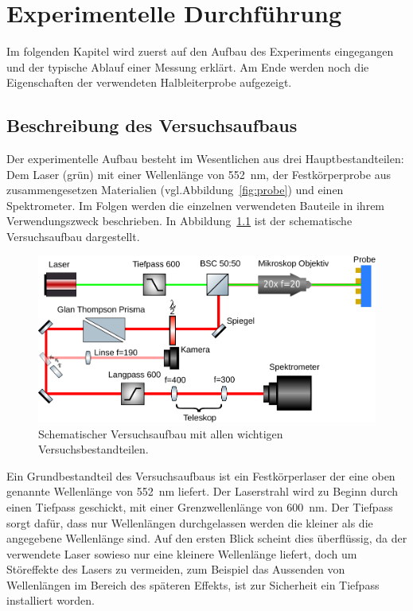 \chapter{Experimentelle Durchführung}
Im folgenden Kapitel wird zuerst auf den Aufbau des Experiments eingegangen 
und der typische Ablauf einer Messung erklärt. 
Am Ende werden noch die Eigenschaften der verwendeten Halbleiterprobe aufgezeigt.
\section{Beschreibung des Versuchsaufbaus}
\label{sec:Beschreibung des Versuchsaufbaus}
Der experimentelle Aufbau besteht im Wesentlichen aus drei Hauptbestandteilen:
Dem Laser (grün) mit einer Wellenlänge von \SI{552}{\nano\meter}, der Festkörperprobe aus zusammengesetzen
Materialien (vgl.Abbildung~\ref{fig:probe}) und einen Spektrometer.
Im Folgen werden die einzelnen verwendeten Bauteile in ihrem Verwendungszweck beschrieben.
In Abbildung~\ref{fig:aufbau} ist der schematische Versuchsaufbau dargestellt.
\begin{figure}
    \centering
    \includegraphics[scale=0.75]{./Plots/setup.pdf}
    \caption{Schematischer Versuchsaufbau mit allen wichtigen Versuchsbestandteilen.}
    \label{fig:aufbau}
\end{figure}
\FloatBarrier

Ein Grundbestandteil des Versuchsaufbaus ist ein Festkörperlaser der eine oben genannte Wellenlänge von 
\SI{552}{\nano\meter} liefert. 
Der Laserstrahl wird zu Beginn durch einen Tiefpass geschickt, mit einer Grenzwellenlänge von 
\SI{600}{\nano\meter}. Der Tiefpass sorgt dafür, dass nur Wellenlängen durchgelassen werden die 
kleiner als die angegebene Wellenlänge sind. Auf den ersten Blick scheint dies überflüssig, da der
verwendete Laser sowieso nur eine kleinere Wellenlänge liefert, doch um Störeffekte des Lasers zu vermeiden, 
zum Beispiel das Aussenden von Wellenlängen im Bereich des späteren Effekts, ist zur Sicherheit ein
Tiefpass installiert worden. 


